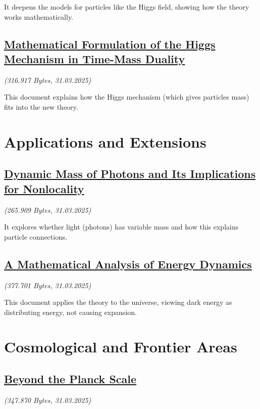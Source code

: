 \documentclass[a4paper,12pt]{article}
\newcommand{\repobase}{https://github.com/jpascher/T0-Time-Mass-Duality/tree/main/2/}
\begin{document}
	It deepens the models for particles like the Higgs field, showing how the theory works mathematically.
	
	\subsection{\small\href{\repobase/pdf/English/Mathematische Formulierung des Higgs-Mechanismus in der Zeit-Masse-Dualität_en.pdf}{Mathematical Formulation of the Higgs Mechanism in Time-Mass Duality}}
	\textit{(316.917 Bytes, 31.03.2025)}
	
	This document explains how the Higgs mechanism (which gives particles mass) fits into the new theory.
	
	\section{Applications and Extensions}
	
	\subsection{\small\href{\repobase/pdf/English/Dynamische Masse von Photonen und ihre Implikationen für Nichtlokalität_en.pdf}{Dynamic Mass of Photons and Its Implications for Nonlocality}}
	\textit{(265.909 Bytes, 31.03.2025)}
	
	It explores whether light (photons) has variable mass and how this explains particle connections.
	
	\subsection{\small\href{\repobase/pdf/English/Eine mathematische Analyse der Energiedynamik_en.pdf}{A Mathematical Analysis of Energy Dynamics}}
	\textit{(377.701 Bytes, 31.03.2025)}
	
	This document applies the theory to the universe, viewing dark energy as distributing energy, not causing expansion.
	
	\section{Cosmological and Frontier Areas}
	
	\subsection{\small\href{\repobase/pdf/English/Jenseits der Planck-Skala_en.pdf}{Beyond the Planck Scale}}
	\textit{(347.870 Bytes, 31.03.2025)}
	
\end{document}
